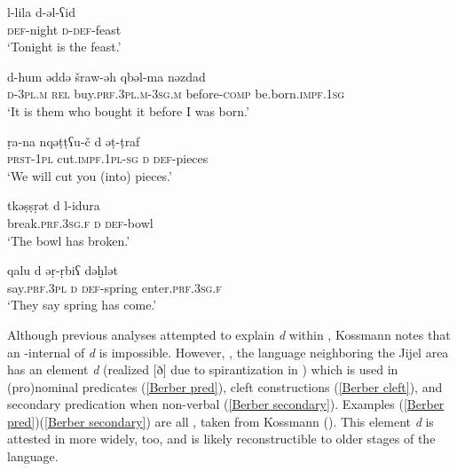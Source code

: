 \documentclass[output=paper]{langsci/langscibook}
\begin{document}
\ea\label{nonverbal}

\gll l-lila  d-ǝl-ʕid\\
     \textsc{def}-night  \textsc{d}-\textsc{def}-feast\\
\glt ‘Tonight is the feast.’
\z

\ea\label{clefts}

\gll d-hum  ǝddǝ  šraw-ǝh   qbǝl-ma  nǝzdad\\
     \textsc{d}-\textsc{3pl.m} \textsc{rel}  buy.\textsc{prf.3pl.m}-\textsc{3sg.m}  before-\textsc{comp} be.born.\textsc{impf.1sg}\\
\glt ‘It is them who bought it before I was born.’
\z

\ea\label{secondary pred}

\gll ṛa-na  nqǝṭṭʕu-č  d  ǝṭ-ṭraf\\
     \textsc{prst}-\textsc{1pl}  cut.\textsc{impf.1pl-sg}  \textsc{d}  \textsc{def}-pieces\\
\glt ‘We will cut you (into) pieces.’
\z

\ea\label{focus}

\gll tkǝṣṣṛǝt  d  l-idura\\
     break.\textsc{prf.3sg.f}  \textsc{d}  \textsc{def}-bowl\\
\glt ‘The bowl has broken.’
\z

\ea\label{left focalizations}

\gll qalu  d  ǝṛ-ṛbiʕ  dǝḫlǝt\\
     say.\textsc{prf.3pl}  \textsc{d}  \textsc{def}-spring  enter.\textsc{prf.3sg.f}\\
\glt ‘They say spring has come.’
\z

Although previous analyses attempted to explain \textit{d} within , Kossmann notes that an -internal  of \textit{d} is impossible. However, , the  language neighboring the Jijel area has an element \textit{d} (realized [ð] due to spirantization in ) which is used in (pro)nominal predicates (\ref{Berber pred}), cleft constructions (\ref{Berber cleft}), and secondary predication when non-verbal (\ref{Berber secondary}). Examples (\ref{Berber pred})\textendash(\ref{Berber secondary}) are all  , taken from Kossmann (\citeyear[135]{Kossmann2014}). This element \textit{d} is attested in  more widely, too, and is likely reconstructible to older stages of the language.

\ea\label{Berber pred}
\end{document}
